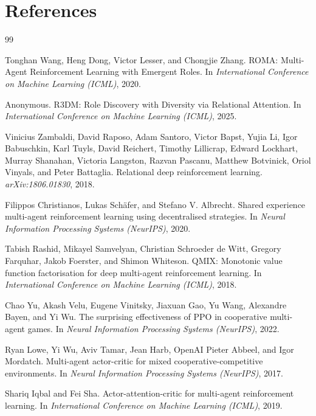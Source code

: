 \documentclass{article}
\begin{document}
\section*{References}
\begin{thebibliography}{99}

Tonghan Wang, Heng Dong, Victor Lesser, and Chongjie Zhang.
\newblock ROMA: Multi-Agent Reinforcement Learning with Emergent Roles.
\newblock In \emph{International Conference on Machine Learning (ICML)}, 2020.

Anonymous.
\newblock R3DM: Role Discovery with Diversity via Relational Attention.
\newblock In \emph{International Conference on Machine Learning (ICML)}, 2025.

Vinicius Zambaldi, David Raposo, Adam Santoro, Victor Bapst, Yujia Li, Igor Babuschkin, Karl Tuyls, David Reichert, Timothy Lillicrap, Edward Lockhart, Murray Shanahan, Victoria Langston, Razvan Pascanu, Matthew Botvinick, Oriol Vinyals, and Peter Battaglia.
\newblock Relational deep reinforcement learning.
\newblock \emph{arXiv:1806.01830}, 2018.

Filippos Christianos, Lukas Schäfer, and Stefano V. Albrecht.
\newblock Shared experience multi-agent reinforcement learning using decentralised strategies.
\newblock In \emph{Neural Information Processing Systems (NeurIPS)}, 2020.

Tabish Rashid, Mikayel Samvelyan, Christian Schroeder de Witt, Gregory Farquhar, Jakob Foerster, and Shimon Whiteson.
\newblock QMIX: Monotonic value function factorisation for deep multi-agent reinforcement learning.
\newblock In \emph{International Conference on Machine Learning (ICML)}, 2018.

Chao Yu, Akash Velu, Eugene Vinitsky, Jiaxuan Gao, Yu Wang, Alexandre Bayen, and Yi Wu.
\newblock The surprising effectiveness of PPO in cooperative multi-agent games.
\newblock In \emph{Neural Information Processing Systems (NeurIPS)}, 2022.

Ryan Lowe, Yi Wu, Aviv Tamar, Jean Harb, OpenAI Pieter Abbeel, and Igor Mordatch.
\newblock Multi-agent actor-critic for mixed cooperative-competitive environments.
\newblock In \emph{Neural Information Processing Systems (NeurIPS)}, 2017.

Shariq Iqbal and Fei Sha.
\newblock Actor-attention-critic for multi-agent reinforcement learning.
\newblock In \emph{International Conference on Machine Learning (ICML)}, 2019.

\end{thebibliography}
\end{document}
